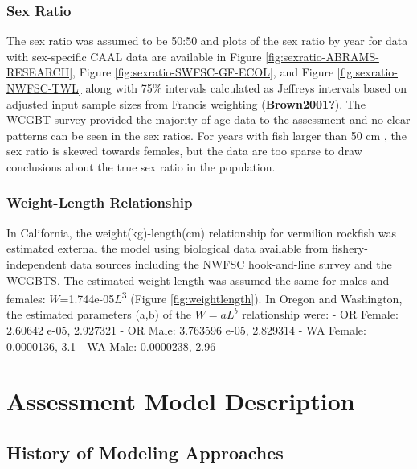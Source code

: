 \documentclass[
  english,
  a4paper,
]{article}
\begin{document}
\hypertarget{sex-ratio}{%
\subsubsection{Sex Ratio}\label{sex-ratio}}

The sex ratio was assumed to be 50:50 and plots of the sex ratio by year for data with sex-specific CAAL data are available in Figure \ref{fig:sexratio-ABRAMS-RESEARCH}, Figure \ref{fig:sexratio-SWFSC-GF-ECOL}, and
Figure \ref{fig:sexratio-NWFSC-TWL} along with 75\% intervals calculated as Jeffreys intervals based on adjusted input sample sizes from Francis weighting (\textbf{Brown2001?}). The WCGBT survey provided the majority of age data to the assessment and no clear patterns can be seen in the sex ratios. For years with fish larger than 50 cm , the sex ratio is skewed towards females, but the data are too sparse to draw conclusions about the true sex ratio in the population.

\hypertarget{weight-length-relationship}{%
\subsubsection{Weight-Length Relationship}\label{weight-length-relationship}}

In California, the weight(kg)-length(cm) relationship for vermilion rockfish was estimated external the
model using biological data available from fishery-independent
data sources including the NWFSC hook-and-line survey and the WCGBTS. The estimated
weight-length was assumed the same for males and females:
\(W\)=1.744e-05\(L\)\textsuperscript{3}
(Figure \ref{fig:weightlength}).
In Oregon and Washington, the estimated parameters (a,b) of the \(W=aL^b\) relationship were:
- OR Female: 2.60642 e-05, 2.927321
- OR Male: 3.763596 e-05, 2.829314
- WA Female: 0.0000136, 3.1
- WA Male: 0.0000238, 2.96

\hypertarget{assessment-model-description}{%
\section{Assessment Model Description}\label{assessment-model-description}}

\hypertarget{history-of-modeling-approaches}{%
\subsection{History of Modeling Approaches}\label{history-of-modeling-approaches}}
\end{document}

